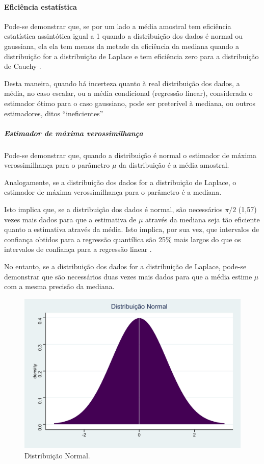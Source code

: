 \documentclass[a4paper, 12pt]{article}
\let\oldparagraph\paragraph
\renewcommand{\paragraph}[1]{\oldparagraph{#1}\mbox{}}
\let\oldsubparagraph\subparagraph
\renewcommand{\subparagraph}[1]{\oldsubparagraph{#1}\mbox{}}
\begin{document}
\hypertarget{eficiencia-estatistica}{%
\paragraph{Eficiência estatística}\label{eficiencia-estatistica}}

Pode-se demonstrar que, se por um lado a média amostral tem eficiência
estatística assintótica igual a 1 quando a distribuição dos dados é
normal ou gaussiana, ela ela tem menos da metade da eficiência da
mediana quando a distribuição for a distribuição de Laplace e tem
eficiência zero para a distribuição de Cauchy
\autocite[p.36]{koenker1978}.

Desta maneira, quando há incerteza quanto à real distribuição dos dados,
a média, no caso escalar, ou a média condicional (regressão linear),
considerada o estimador ótimo para o caso gaussiano, pode ser preterível
à mediana, ou outros estimadores, ditos ``ineficientes''
\autocite[p.36]{koenker1978}

\hypertarget{estimador-de-maxima-verossimilhanca}{%
\subparagraph{Estimador de máxima
verossimilhança}\label{estimador-de-maxima-verossimilhanca}}

Pode-se demonstrar que, quando a distribuição é normal o estimador de
máxima verossimilhança para o parâmetro \(\mu\) da distribuição é a
média amostral.

Analogamente, se a distribuição dos dados for a distribuição de Laplace,
o estimador de máxima verossimilhança para o parâmetro é a mediana.

Isto implica que, se a distribuição dos dados é normal, são necessários
\(\pi/2\) (1,57) vezes mais dados para que a estimativa de \(\mu\)
através da mediana seja tão eficiente quanto a estimativa através da
média. Isto implica, por sua vez, que intervalos de confiança obtidos
para a regressão quantílica são 25\% mais largos do que os intervalos de
confiança para a regressão linear
\autocites[354]{koenker2000}[92]{dasGupta}.

No entanto, se a distribuição dos dados for a distribuição de Laplace,
pode-se demonstrar que são necessários duas vezes mais dados para que a
média estime \(\mu\) com a mesma precisão da mediana.

\twocolumn

\begin{figure}[H]

{\centering \includegraphics[width=0.7\linewidth]{images/dist_normal-1} 

}

\caption{Distribuição Normal.}\label{fig:dist_normal}
\end{figure}
\end{document}

